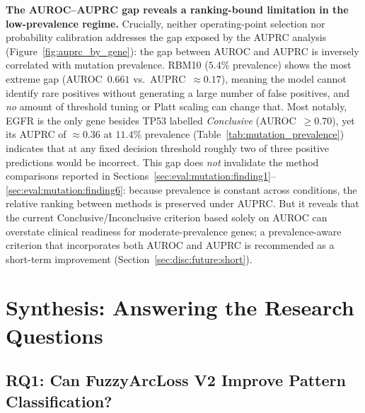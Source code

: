 \textbf{The AUROC--AUPRC gap reveals a ranking-bound limitation
in the low-prevalence regime.}
Crucially, neither operating-point selection nor probability
calibration addresses the gap exposed by the AUPRC analysis
(Figure~\ref{fig:auprc_by_gene}): the gap between AUROC and AUPRC
is inversely correlated with mutation prevalence.
RBM10 ($5.4\%$ prevalence) shows the most extreme gap
(AUROC~$0.661$ vs.\ AUPRC~$\approx 0.17$), meaning the model cannot
identify rare positives without generating a large number of false
positives, and \emph{no} amount of threshold tuning or Platt
scaling can change that.
Most notably, EGFR is the only gene besides TP53 labelled
\emph{Conclusive} (AUROC~$\geq 0.70$), yet its AUPRC of
$\approx 0.36$ at $11.4\%$ prevalence
(Table~\ref{tab:mutation_prevalence}) indicates that at any fixed
decision threshold roughly two of three positive predictions would
be incorrect.
This gap does \emph{not} invalidate the method comparisons reported
in Sections~\ref{sec:eval:mutation:finding1}--%
\ref{sec:eval:mutation:finding6}: because prevalence is constant
across conditions, the relative ranking between methods is
preserved under AUPRC.
But it reveals that the current Conclusive/Inconclusive criterion
based solely on AUROC can overstate clinical readiness for
moderate-prevalence genes; a prevalence-aware criterion that
incorporates both AUROC and AUPRC is recommended as a short-term
improvement (Section~\ref{sec:disc:future:short}).

\section{Synthesis: Answering the Research Questions}
\label{sec:eval:rq}

\subsection{RQ1: Can FuzzyArcLoss V2 Improve Pattern Classification?}
\label{sec:eval:rq1}

